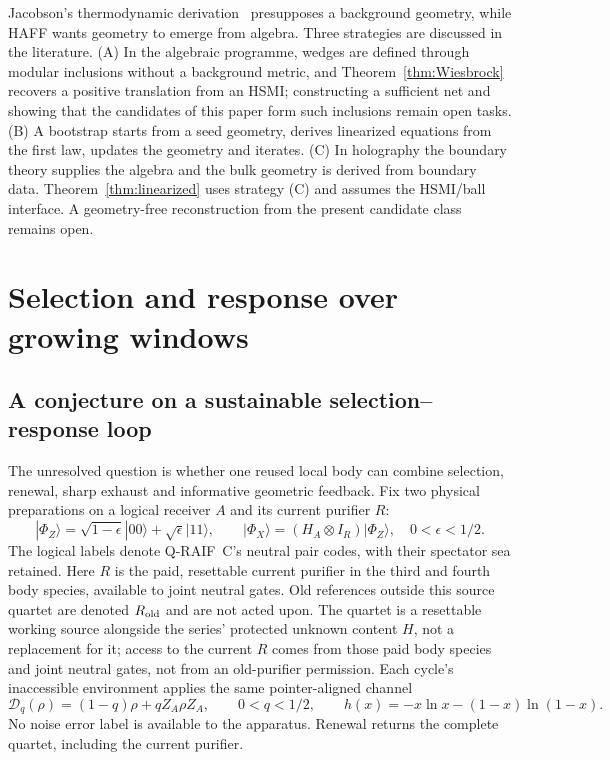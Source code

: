 \documentclass[12pt,a4paper]{article}
\begin{document}
Jacobson's thermodynamic derivation~\cite{Jacobson1995} presupposes a background geometry, while HAFF wants geometry to emerge from algebra. Three strategies are discussed in the literature. (A) In the algebraic programme, wedges are defined through modular inclusions without a background metric, and Theorem~\ref{thm:Wiesbrock} recovers a positive translation from an HSMI; constructing a sufficient net and showing that the candidates of this paper form such inclusions remain open tasks. (B) A bootstrap starts from a seed geometry, derives linearized equations from the first law, updates the geometry and iterates. (C) In holography the boundary theory supplies the algebra and the bulk geometry is derived from boundary data. Theorem~\ref{thm:linearized} uses strategy (C) and assumes the HSMI/ball interface. A geometry-free reconstruction from the present candidate class remains open.


\section{Selection and response over growing windows}

\subsection{A conjecture on a sustainable selection--response loop}

The unresolved question is whether one reused local body can combine
selection, renewal, sharp exhaust and informative geometric feedback.
Fix two physical preparations on a logical receiver $A$ and its current
purifier $R$:
\[
 |\Phi_Z\rangle=\sqrt{1-\epsilon}|00\rangle+
                   \sqrt\epsilon|11\rangle,\qquad
 |\Phi_X\rangle=(H_A\otimes I_R)|\Phi_Z\rangle,
 \quad 0<\epsilon<1/2.
\]
The logical labels denote Q-RAIF~C's neutral pair codes, with their
spectator sea retained. Here $R$ is the paid, resettable current purifier
in the third and fourth body species, available to joint neutral gates.
Old references outside this source quartet are denoted $R_{\rm old}$
and are not acted upon. The quartet is a resettable working source
alongside the series' protected unknown content $H$, not a replacement
for it; access to the current $R$ comes from those paid body species
and joint neutral gates, not from an old-purifier permission. Each cycle's inaccessible environment applies
the same pointer-aligned channel
\[
 \mathcal D_q(\rho)=(1-q)\rho+qZ_A\rho Z_A,
 \qquad 0<q<1/2,\qquad h(x)=-x\ln x-(1-x)\ln(1-x).
\]
No noise error label is available to the apparatus. Renewal returns the
complete quartet, including the current purifier.
\end{document}
